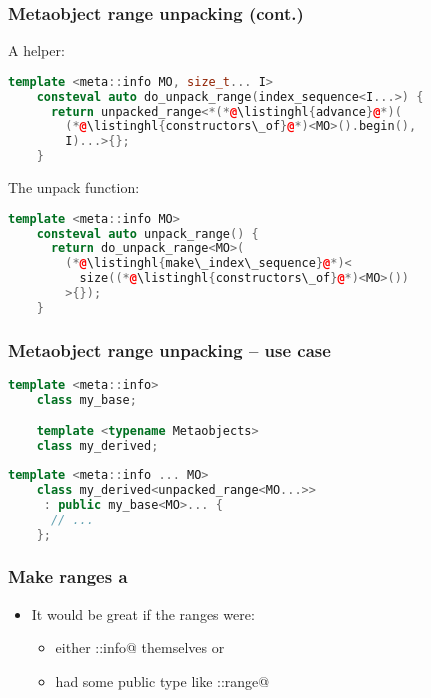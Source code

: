 \documentclass[compress,table,xcolor=table]{beamer}
\begin{document}
\begin{frame}[fragile]
\frametitle{Metaobject range unpacking (cont.)}
    \large
    A helper:
    \begin{lstlisting}[language=c++]
    template <meta::info MO, size_t... I>
    consteval auto do_unpack_range(index_sequence<I...>) {
      return unpacked_range<*(*@\listinghl{advance}@*)(
        (*@\listinghl{constructors\_of}@*)<MO>().begin(),
        I)...>{};
    }
    \end{lstlisting}
    \vfill
    The unpack function:
    \begin{lstlisting}[language=c++]
    template <meta::info MO>
    consteval auto unpack_range() {
      return do_unpack_range<MO>(
		(*@\listinghl{make\_index\_sequence}@*)<
          size((*@\listinghl{constructors\_of}@*)<MO>())
        >{});
    }
    \end{lstlisting}
\end{frame}
\begin{frame}[fragile]
\frametitle{Metaobject range unpacking -- use case}
    \begin{lstlisting}[language=c++]
    template <meta::info>
    class my_base;

    template <typename Metaobjects>
    class my_derived;
    \end{lstlisting}

    \begin{lstlisting}[language=c++]
    template <meta::info ... MO>
    class my_derived<unpacked_range<MO...>>
     : public my_base<MO>... {
      // ...
    };
    \end{lstlisting}
\end{frame}
\begin{frame}[fragile]
\frametitle{Make ranges a }
    \Huge
    \begin{itemize}
        \item It would be great if the ranges were:
        \begin{itemize}
            \LARGE
            \item either \verb@meta::info@ themselves or
            \item had some public type like \verb@meta::range@
        \end{itemize}
    \end{itemize}
\end{frame}
\end{document}

